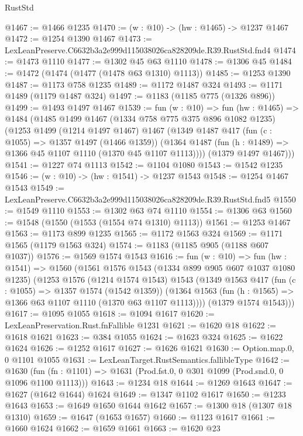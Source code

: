 \begin{lexlean}{RustStd}
\begin{coremodule}
@1467 := @1466 @1235
@1470 := (w : @10) -> (hw : @1465) -> @1237 @1467
@1472 := @1254 @1390 @1467
@1473 := LexLeanPreserve.C6632b3a2e999d115038026ca828209de.R39.RustStd.fnd4
@1474 := @1473 @1110
@1477 := @1302 @45 @63 @1110
@1478 := @1306 @45
@1484 := @1472 (@1474 (@1477 (@1478 @63 @1310) @1113))
@1485 := @1253 @1390
@1487 := @1173 @758 @1235
@1489 := @1172 @1487 @324
@1493 := @1171 @1489 (@1179 @1487 @324)
@1497 := @1183 (@1185 @775 (@1326 @896))
@1499 := @1493 @1497 @1467
@1539 := fun (w : @10) =>
  fun (hw : @1465) =>
  @1484
    (@1485
      @1499
      @1467
      (@1334 @758 @775 @375 @896 @1082 @1235)
      (@1253
        @1499
        (@1214 @1497 @1467)
        @1467
        (@1349
          @1487
          @417
          (fun (c : @1055) => @1357 @1497 (@1466 @1359))
          (@1364 @1487 (fun (h : @1489) => @1366 @45 @1107 @1110 (@1370 @45 @1107 @1113))))
        (@1379 @1497 @1467)))
@1541 := @1227 @74 @1113
@1542 := @1104 @1080
@1543 := @1542 @1235
@1546 := (w : @10) -> (hw : @1541) -> @1237 @1543
@1548 := @1254 @1467 @1543
@1549 := LexLeanPreserve.C6632b3a2e999d115038026ca828209de.R39.RustStd.fnd5
@1550 := @1549 @1110
@1553 := @1302 @63 @74 @1110
@1554 := @1306 @63
@1560 := @1548 (@1550 (@1553 (@1554 @74 @1310) @1113))
@1561 := @1253 @1467
@1563 := @1173 @899 @1235
@1565 := @1172 @1563 @324
@1569 := @1171 @1565 (@1179 @1563 @324)
@1574 := @1183 (@1185 @905 (@1188 @607 @1037))
@1576 := @1569 @1574 @1543
@1616 := fun (w : @10) =>
  fun (hw : @1541) =>
  @1560
    (@1561
      @1576
      @1543
      (@1334 @899 @905 @607 @1037 @1080 @1235)
      (@1253
        @1576
        (@1214 @1574 @1543)
        @1543
        (@1349
          @1563
          @417
          (fun (c : @1055) => @1357 @1574 (@1542 @1359))
          (@1364 @1563 (fun (h : @1565) => @1366 @63 @1107 @1110 (@1370 @63 @1107 @1113))))
        (@1379 @1574 @1543)))
@1617 := @1095 @1055
@1618 := @1094 @1617
@1620 := LexLeanPreservation.Rust.fnFallible @1231
@1621 := @1620 @18
@1622 := @1618 @1621
@1623 := @384 @1055
@1624 := @1623 @324
@1625 := @1622 @1624
@1626 := @1252 @1617
@1627 := @1626 @1621
@1630 := Option.map.{0, 0} @1101 @1055
@1631 := LexLeanTarget.RustSemantics.fallibleType
@1642 := @1630
    (fun (fn : @1101) => @1631 (Prod.fst.{0, 0} @301 @1099 (Prod.snd.{0, 0} @1096 @1100 @1113)))
@1643 := @1234 @18
@1644 := @1269 @1643
@1647 := @1627 (@1642 @1644) @1624
@1649 := @1347 @1102 @1617
@1650 := @1233 @1643
@1653 := @1649 @1650 @1644 @1642
@1657 := @1300 @18 (@1307 @18 @1310)
@1659 := @1647 (@1653 @1657)
@1660 := @1123 @1617
@1661 := @1660 @1624
@1662 := @1659 @1661
@1663 := @1620 @23

\end{coremodule}
\end{lexlean}
